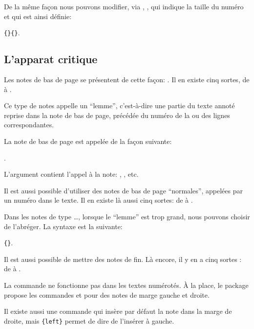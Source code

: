 De la même façon nous pouvons modifier, via , , qui indique la taille du numéro et qui est ainsi définie:

 \verb|{|\verb|}{|\verb|}|. 
 

\subsection{L'apparat critique}

Les notes de bas de page se présentent de cette façon:  . Il en existe cinq sortes, de  à .


Ce type de notes appelle un \enquote{lemme}, c'est-à-dire une partie du texte annoté reprise dans la note de bas de page, précédée du numéro de la ou des lignes correspondantes. 

La note de bas de page est appelée de la façon suivante:  

. 

L'argument  contient l'appel à la note: , , etc.

Il est aussi possible d'utiliser  des  notes de bas de page \enquote{normales}, appelées par un numéro dans le texte. Il  en existe là aussi cinq sortes: de  à .

Dans les notes de type \dots, lorsque le \enquote{lemme} est trop grand, nous pouvons choisir de l'abréger. La syntaxe est la suivante: 

\verb|{|\verb|}|. 

\begin{plusloins}
Il est aussi possible de mettre des notes de fin. Là encore, il y en a cinq sortes :  de  à .

La commande  ne fonctionne pas dans les textes numérotés. À la place, le package propose les commandes  et  pour des notes de marge gauche et droite.

Il existe aussi une commande  qui insère par défaut la note dans la marge de droite, mais \verb={left}= permet de dire de l'insérer à gauche.
\end{plusloins} 

